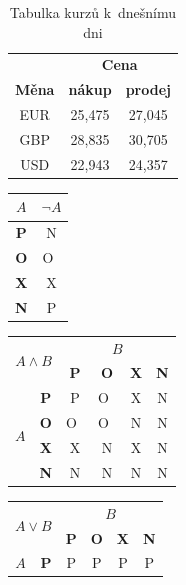 \documentclass[11pt]{article}
\begin{document}
\begin{table}[ht]
\centering
    \begin{tabular}{|c|c|c|} \hline
    & \multicolumn{2}{c|}{\textbf{Cena}} \\ \cline{2-3}
    \textbf{Měna} & \textbf{nákup} & \textbf{prodej} \\ \hline
    EUR & 25,475 & 27,045 \\
    GBP & 28,835 & 30,705 \\
    USD & 22,943 & 24,357\\ \hline
    \end{tabular} 
    \caption{Tabulka kurzů k~dnešnímu dni}
    \label{tab:fiat}
\end{table}
\begin{table}[ht]
    \centering
    \begin{tabular}{|c|c|} \hline
         $A$ & $\neg A$ \\ \hline
         \textbf{P} & N \\ \hline
         \textbf{O} & O~\\ \hline         
         \textbf{X} & X \\ \hline
         \textbf{N} & P \\ \hline
    \end{tabular}
    \begin{tabular}{|c|c|c|c|c|c|} \hline
         \multicolumn{2}{|c|}{\multirow{2}{*}{$A \wedge B$}} & \multicolumn{4}{c|}{$B$}\\ \cline{3-6}
         \multicolumn{2}{|c|}{} & \textbf{P} & \textbf{O} & \textbf{X} & \textbf{N} \\ \hline
         \multirow{4}{*}{$A$}   & \textbf{P}    & P & O~& X & N\\ \cline{2-6} 
                                & \textbf{O}    & O~& O~& N & N\\ \cline{2-6} 
                                & \textbf{X}    & X & N & X & N\\ \cline{2-6} 
                                & \textbf{N}    & N & N & N & N\\ \hline
    \end{tabular}
    \begin{tabular}{|c|c|c|c|c|c|} \hline
         \multicolumn{2}{|c|}{\multirow{2}{*}{$A \vee B$}} & \multicolumn{4}{c|}{$B$}\\ \cline{3-6}
         \multicolumn{2}{|c|}{} & \textbf{P} & \textbf{O} & \textbf{X} & \textbf{N} \\ \hline
         \multirow{4}{*}{$A$}   & \textbf{P}    & P & P & P & P\\ \cline{2-6} 

\end{tabular}
\end{table}
\end{document}

